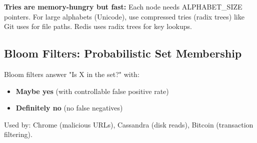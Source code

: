 \begin{tipbox}
\textbf{Tries are memory-hungry but fast:} Each node needs ALPHABET\_SIZE pointers. For large alphabets (Unicode), use compressed tries (radix trees) like Git uses for file paths. Redis uses radix trees for key lookups.
\end{tipbox}

\subsection{Bloom Filters: Probabilistic Set Membership}

Bloom filters answer "Is X in the set?" with:
\begin{itemize}
    \item \textbf{Maybe yes} (with controllable false positive rate)
    \item \textbf{Definitely no} (no false negatives)
\end{itemize}

Used by: Chrome (malicious URLs), Cassandra (disk reads), Bitcoin (transaction filtering).


